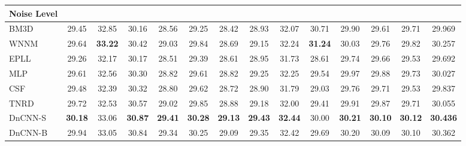 \documentclass[journal]{IEEEtran}
\begin{document}
\begin{table*}[htbp]
\begin{tabular}{|l|c|c|c|c|c|c|c|c|c|c|c|c|c|}
     Noise Level& \multicolumn{13}{c|}{}   \\ \hline
    BM3D~\cite{dabov2007image} & 29.45 & 32.85 & 30.16 & 28.56 & 29.25 & 28.42 & 28.93 & 32.07 & 30.71 & 29.90 & 29.61 & 29.71 &  29.969  \\\hline
     WNNM~\cite{gu2014weighted}& 29.64 & \textbf{33.22} & 30.42 & 29.03 & 29.84 & 28.69 & 29.15 & 32.24 & \textbf{31.24} & 30.03 & 29.76 & 29.82 & 30.257   \\\hline
     EPLL~\cite{zoran2011learning}& 29.26 & 32.17 & 30.17 & 28.51 & 29.39 & 28.61 & 28.95 & 31.73 & 28.61 & 29.74 & 29.66 & 29.53 & 29.692   \\\hline
     MLP~\cite{burger2012image}& 29.61 & 32.56 & 30.30 & 28.82 & 29.61 & 28.82 & 29.25 & 32.25 & 29.54 & 29.97 & 29.88 & 29.73 & 30.027   \\\hline
     CSF~\cite{schmidt2014shrinkage}& 29.48 & 32.39 & 30.32 & 28.80 & 29.62 & 28.72 & 28.90 & 31.79 & 29.03 & 29.76 & 29.71 & 29.53 &  29.837  \\\hline
     TNRD~\cite{chen2015trainable}& 29.72 & 32.53 & 30.57 & 29.02 & 29.85 & 28.88 & 29.18 & 32.00 & 29.41 & 29.91 & 29.87 & 29.71 & 30.055    \\\hline
     DnCNN-S& \textbf{30.18} & 33.06 & \textbf{30.87} & \textbf{29.41} & \textbf{30.28} & \textbf{29.13} & \textbf{29.43} & \textbf{32.44} & 30.00 & \textbf{30.21} & \textbf{30.10 }& \textbf{30.12} &  \textbf{30.436}  \\\hline
     DnCNN-B& 29.94 & 33.05 & 30.84 & 29.34 &30.25 & 29.09 & 29.35 & 32.42 & 29.69 & 30.20 & 30.09 & 30.10 &  30.362  \\\hline \hline


\end{tabular}
\end{table*}
\end{document}
